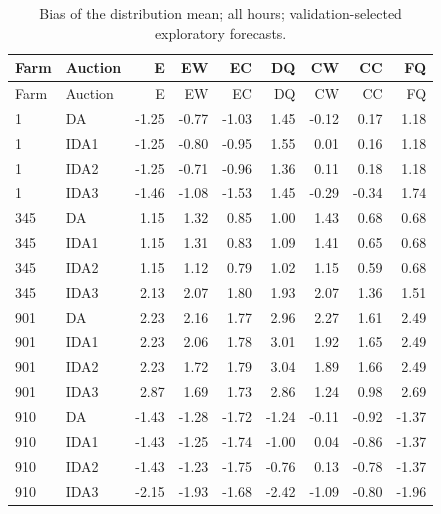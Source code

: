 \documentclass[11pt,a4paper]{article}
\begin{document}
\begin{longtable}{llrrrrrrr}
\caption{Bias of the distribution mean; all hours; validation-selected exploratory forecasts.}\\
\toprule Farm & Auction & E & EW & EC & DQ & CW & CC & FQ \\
\midrule\endfirsthead
\toprule Farm & Auction & E & EW & EC & DQ & CW & CC & FQ \\
\midrule\endhead
1 & DA & -1.25 & -0.77 & -1.03 & 1.45 & -0.12 & 0.17 & 1.18 \\
1 & IDA1 & -1.25 & -0.80 & -0.95 & 1.55 & 0.01 & 0.16 & 1.18 \\
1 & IDA2 & -1.25 & -0.71 & -0.96 & 1.36 & 0.11 & 0.18 & 1.18 \\
1 & IDA3 & -1.46 & -1.08 & -1.53 & 1.45 & -0.29 & -0.34 & 1.74 \\
\midrule
345 & DA & 1.15 & 1.32 & 0.85 & 1.00 & 1.43 & 0.68 & 0.68 \\
345 & IDA1 & 1.15 & 1.31 & 0.83 & 1.09 & 1.41 & 0.65 & 0.68 \\
345 & IDA2 & 1.15 & 1.12 & 0.79 & 1.02 & 1.15 & 0.59 & 0.68 \\
345 & IDA3 & 2.13 & 2.07 & 1.80 & 1.93 & 2.07 & 1.36 & 1.51 \\
\midrule
901 & DA & 2.23 & 2.16 & 1.77 & 2.96 & 2.27 & 1.61 & 2.49 \\
901 & IDA1 & 2.23 & 2.06 & 1.78 & 3.01 & 1.92 & 1.65 & 2.49 \\
901 & IDA2 & 2.23 & 1.72 & 1.79 & 3.04 & 1.89 & 1.66 & 2.49 \\
901 & IDA3 & 2.87 & 1.69 & 1.73 & 2.86 & 1.24 & 0.98 & 2.69 \\
\midrule
910 & DA & -1.43 & -1.28 & -1.72 & -1.24 & -0.11 & -0.92 & -1.37 \\
910 & IDA1 & -1.43 & -1.25 & -1.74 & -1.00 & 0.04 & -0.86 & -1.37 \\
910 & IDA2 & -1.43 & -1.23 & -1.75 & -0.76 & 0.13 & -0.78 & -1.37 \\
910 & IDA3 & -2.15 & -1.93 & -1.68 & -2.42 & -1.09 & -0.80 & -1.96 \\
\midrule
\bottomrule\end{longtable}
\normalsize
\small
\end{document}
